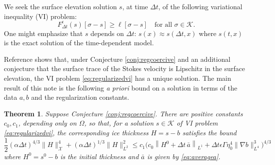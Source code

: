 \documentclass[12pt]{article}
\newtheorem{theorem}{Theorem}
\newcommand{\cK}{\ensuremath{\mathcal{K}}}
\newcommand{\cX}{\ensuremath{\mathcal{X}}}
\newcommand{\grad}{\ensuremath{\nabla}}
\newcommand{\eps}{\ensuremath{\epsilon}}
\begin{document}
We seek the surface elevation solution $s$, at time $\Delta t$, of the following variational inequality (VI) problem:
\begin{equation}
F^\eps_{\Delta t}(s)[\sigma-s] \ge \ell[\sigma-s] \quad \text{for all } \sigma \in \cK. \label{eq:regularizedvi}
\end{equation}
One might emphasize that $s$ depends on $\Delta t$: $s(x) \approx s(\Delta t,x)$ where $s(t,x)$ is the exact solution of the time-dependent model.

Reference \cite{Bueler2025} shows that, under Conjecture \ref{conj:regcoercive} and an additional conjecture that the surface trace of the Stokes velocity is Lipschitz in the surface elevation, the VI problem \eqref{eq:regularizedvi} has a unique solution.  The main result of this note is the following \emph{a priori} bound on a solution in terms of the data $a,b$ and the regularization constants.

\begin{theorem}
Suppose Conjecture \ref{conj:regcoercive}.  There are positive constants $c_0,c_1$, depending only on $\Omega$, so that, for a solution $s\in\cK$ of VI problem \eqref{eq:regularizedvi}, the corresponding ice thickness $H=s-b$ satisfies the bound
\begin{equation}
\frac{1}{2} (\alpha \Delta t)^{4/3} \|H\|_{\cX}^4 + (\alpha \Delta t)^{1/3} \|H\|_{L^2}^2 \le c_1 \Big(c_0\left\|H^0+\Delta t\,\bar a\right\|_{L^1}  + \Delta t \eps \Gamma \eta_0^4 \|\grad b\|_{L^4}^3\Big)^{4/3} \label{eq:thebound}
\end{equation}
where $H^0=s^0-b$ is the initial thickness and $\bar a$ is given by \eqref{eq:averagea}.
\end{theorem}
\end{document}
